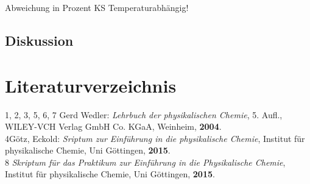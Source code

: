 \documentclass[12pt,a4paper,titlepage,headinclude,bibtotoc]{scrartcl}
\begin{document}

  
Abweichung in Prozent
KS Temperaturabhängig!







\subsection{Diskussion}

\newpage

\section{Literaturverzeichnis}
\begin{flushleft}
1, 2, 3, 5, 6, 7 \quad Gerd Wedler: \emph{Lehrbuch der physikalischen Chemie}, 5. Aufl., WILEY-VCH Verlag GmbH Co. KGaA, Weinheim, \textbf{2004}.\\
\vspace{0,5 cm}
4\quad Götz, Eckold: \emph{Sriptum zur Einführung in die physikalische Chemie}, Institut für physikalische Chemie, Uni Göttingen, \textbf{2015}.\\
\vspace{0,5 cm}
8 \quad \emph{Skriptum für das Praktikum zur Einführung in die Physikalische Chemie}, Institut für physikalische Chemie, Uni Göttingen, \textbf{2015}.\\
\end{flushleft}
\end{document}
